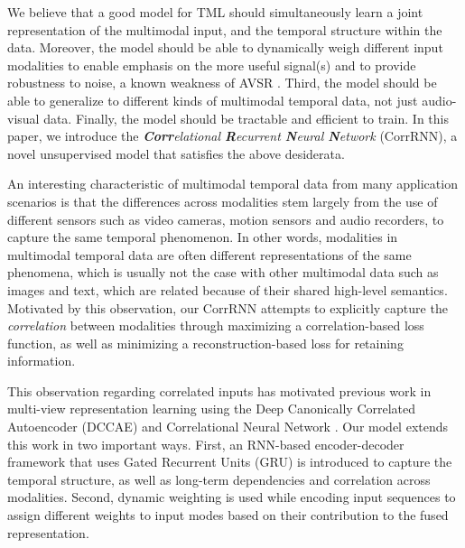 \documentclass[10pt,twocolumn,letterpaper]{article}
\begin{document}
We believe that a good model for TML should simultaneously learn a joint representation of the multimodal input, and the temporal structure within the data. Moreover, the model should be able to dynamically weigh different input modalities to enable emphasis on the more useful signal(s) and to provide robustness to noise, a known weakness of AVSR \cite{katsaggelos2015audiovisual}. Third, the model should be able to generalize to different kinds of multimodal temporal data, not just audio-visual data. Finally, the model should be tractable and efficient to train. In this paper, we introduce the \textit{\textbf{Corr}elational \textbf{R}ecurrent \textbf{N}eural \textbf{N}etwork} (CorrRNN), a novel unsupervised model that satisfies the above desiderata.


An interesting characteristic of multimodal temporal data from many application scenarios is that the differences across modalities stem largely from the use of different sensors such as video cameras, motion sensors and audio recorders, to capture the same temporal phenomenon. In other words, modalities in multimodal temporal data are often different representations of the same phenomena, which is usually not the case with other multimodal data such as images and text, which are related because of their shared high-level semantics. Motivated by this observation, our CorrRNN attempts to explicitly capture the \textit{correlation} between modalities through maximizing a correlation-based loss function, as well as minimizing a reconstruction-based loss for retaining information. 

This observation regarding correlated inputs has motivated previous work in multi-view representation learning using the Deep Canonically Correlated Autoencoder (DCCAE) \cite{wang2015deep} and Correlational Neural Network \cite{chandar2015correlational}. Our model extends this work in two important ways. First, an RNN-based encoder-decoder framework that uses Gated Recurrent Units (GRU) \cite{ChoMGBBSB14} is introduced to capture the  temporal structure, as well as long-term dependencies and correlation across modalities. Second, dynamic weighting is used while encoding input sequences to assign different weights to input modes based on their contribution to the fused representation. %
\end{document}
